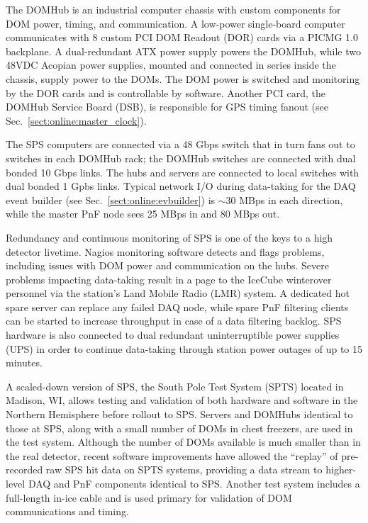 The DOMHub is an industrial computer chassis with custom components for
DOM power, timing, and communication.  A low-power single-board computer
communicates with 8 custom PCI DOM Readout (DOR) cards via a PICMG 1.0 backplane.  A
dual-redundant ATX power supply powers the DOMHub, while two 48VDC Acopian
power supplies, mounted and connected in series inside the chassis, supply
power to the DOMs.  The DOM power is switched and monitoring by the DOR
cards and is controllable by software.  Another PCI card, the DOMHub
Service Board (DSB), is responsible for GPS timing fanout (see
Sec.~\ref{sect:online:master_clock}).


The SPS computers are connected via a 48 Gbps switch that in turn fans out
to switches in each DOMHub rack; the DOMHub switches are connected with
dual bonded 10 Gbps links.  The hubs and servers are connected to local
switches with dual bonded 1 Gpbs links.  Typical network I/O during data-taking for the
DAQ event builder (see Sec.~\ref{sect:online:evbuilder}) is $\sim30$ MBps in each
direction, while the master PnF node sees 25 MBps in and 80 MBps out.

Redundancy and continuous monitoring of SPS is one of the keys to a high
detector livetime.  Nagios monitoring software detects and flags problems,
including issues with DOM power and communication on the hubs.  Severe
problems impacting data-taking result in a page to the IceCube
winterover personnel via the station's Land Mobile Radio (LMR) system. 
A dedicated hot spare server can replace any failed DAQ
node, while spare PnF filtering clients can be started to increase
throughput in case of a data filtering backlog.  SPS hardware is also
connected to dual redundant uninterruptible power supplies 
(UPS) in order to continue data-taking through station power outages of up
to 15 minutes.  

A scaled-down version of SPS, the South Pole Test System (SPTS)
located in Madison, WI, allows
testing and validation of both hardware and software in the Northern
Hemisphere before rollout to SPS.  Servers and DOMHubs identical to those
at SPS, along with a small number of DOMs in chest freezers, are used in
the test system.  Although the number of DOMs available is much smaller
than in the real detector, recent software improvements have allowed the
``replay'' of pre-recorded raw SPS hit data on SPTS systems, providing a data stream to
higher-level DAQ and PnF components identical to SPS.  Another test system
includes a full-length in-ice cable and is used primary for validation of
DOM communications and timing.

